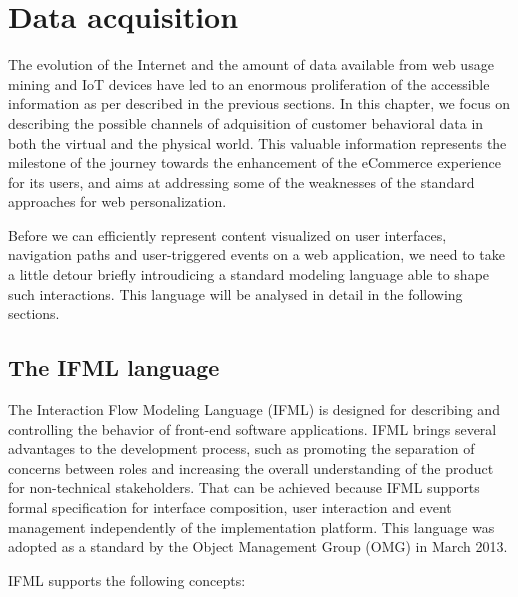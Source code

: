 \chead{}
\chapter{Data acquisition}

The evolution of the Internet and the amount of data available from web usage mining and IoT devices have led to an enormous proliferation of the accessible information as per described in the previous sections.  In this chapter, we focus on describing the possible channels of adquisition of customer behavioral data in both the virtual and the physical world. This valuable information represents the milestone of the journey towards the enhancement of the eCommerce experience for its users, and aims at addressing some of the weaknesses of the standard approaches for web personalization.

Before we can efficiently represent content visualized on user interfaces, navigation paths and user-triggered events on a web application, we need to take a little detour briefly introudicing a standard modeling language able to shape such interactions. This language will be analysed in detail in the following sections.

\section{The IFML language}
\label{the-ifml-language}

The Interaction Flow Modeling Language (IFML)\cite{IFML-1, IFML-2} is designed for describing and controlling the behavior of front-end software applications. IFML brings several advantages to the development process, such as promoting the separation of concerns between roles and increasing the overall understanding of the product for non-technical stakeholders. That can be achieved because IFML supports formal specification for interface composition, user interaction and event management independently of the implementation platform. This language was adopted as a standard by the Object Management Group (OMG) in March 2013.

IFML supports the following concepts: 

